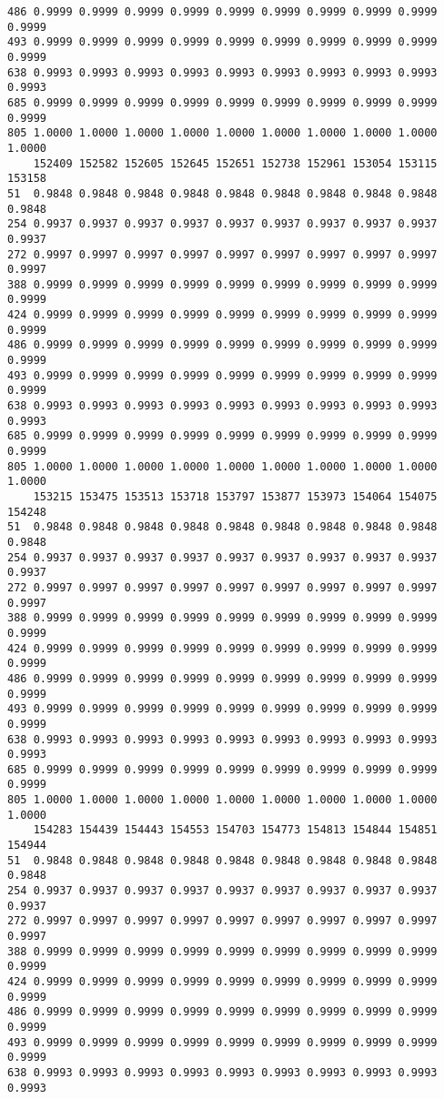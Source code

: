 \documentclass[
]{report}
\begin{document}
\begin{verbatim}
486 0.9999 0.9999 0.9999 0.9999 0.9999 0.9999 0.9999 0.9999 0.9999 0.9999
493 0.9999 0.9999 0.9999 0.9999 0.9999 0.9999 0.9999 0.9999 0.9999 0.9999
638 0.9993 0.9993 0.9993 0.9993 0.9993 0.9993 0.9993 0.9993 0.9993 0.9993
685 0.9999 0.9999 0.9999 0.9999 0.9999 0.9999 0.9999 0.9999 0.9999 0.9999
805 1.0000 1.0000 1.0000 1.0000 1.0000 1.0000 1.0000 1.0000 1.0000 1.0000
    152409 152582 152605 152645 152651 152738 152961 153054 153115 153158
51  0.9848 0.9848 0.9848 0.9848 0.9848 0.9848 0.9848 0.9848 0.9848 0.9848
254 0.9937 0.9937 0.9937 0.9937 0.9937 0.9937 0.9937 0.9937 0.9937 0.9937
272 0.9997 0.9997 0.9997 0.9997 0.9997 0.9997 0.9997 0.9997 0.9997 0.9997
388 0.9999 0.9999 0.9999 0.9999 0.9999 0.9999 0.9999 0.9999 0.9999 0.9999
424 0.9999 0.9999 0.9999 0.9999 0.9999 0.9999 0.9999 0.9999 0.9999 0.9999
486 0.9999 0.9999 0.9999 0.9999 0.9999 0.9999 0.9999 0.9999 0.9999 0.9999
493 0.9999 0.9999 0.9999 0.9999 0.9999 0.9999 0.9999 0.9999 0.9999 0.9999
638 0.9993 0.9993 0.9993 0.9993 0.9993 0.9993 0.9993 0.9993 0.9993 0.9993
685 0.9999 0.9999 0.9999 0.9999 0.9999 0.9999 0.9999 0.9999 0.9999 0.9999
805 1.0000 1.0000 1.0000 1.0000 1.0000 1.0000 1.0000 1.0000 1.0000 1.0000
    153215 153475 153513 153718 153797 153877 153973 154064 154075 154248
51  0.9848 0.9848 0.9848 0.9848 0.9848 0.9848 0.9848 0.9848 0.9848 0.9848
254 0.9937 0.9937 0.9937 0.9937 0.9937 0.9937 0.9937 0.9937 0.9937 0.9937
272 0.9997 0.9997 0.9997 0.9997 0.9997 0.9997 0.9997 0.9997 0.9997 0.9997
388 0.9999 0.9999 0.9999 0.9999 0.9999 0.9999 0.9999 0.9999 0.9999 0.9999
424 0.9999 0.9999 0.9999 0.9999 0.9999 0.9999 0.9999 0.9999 0.9999 0.9999
486 0.9999 0.9999 0.9999 0.9999 0.9999 0.9999 0.9999 0.9999 0.9999 0.9999
493 0.9999 0.9999 0.9999 0.9999 0.9999 0.9999 0.9999 0.9999 0.9999 0.9999
638 0.9993 0.9993 0.9993 0.9993 0.9993 0.9993 0.9993 0.9993 0.9993 0.9993
685 0.9999 0.9999 0.9999 0.9999 0.9999 0.9999 0.9999 0.9999 0.9999 0.9999
805 1.0000 1.0000 1.0000 1.0000 1.0000 1.0000 1.0000 1.0000 1.0000 1.0000
    154283 154439 154443 154553 154703 154773 154813 154844 154851 154944
51  0.9848 0.9848 0.9848 0.9848 0.9848 0.9848 0.9848 0.9848 0.9848 0.9848
254 0.9937 0.9937 0.9937 0.9937 0.9937 0.9937 0.9937 0.9937 0.9937 0.9937
272 0.9997 0.9997 0.9997 0.9997 0.9997 0.9997 0.9997 0.9997 0.9997 0.9997
388 0.9999 0.9999 0.9999 0.9999 0.9999 0.9999 0.9999 0.9999 0.9999 0.9999
424 0.9999 0.9999 0.9999 0.9999 0.9999 0.9999 0.9999 0.9999 0.9999 0.9999
486 0.9999 0.9999 0.9999 0.9999 0.9999 0.9999 0.9999 0.9999 0.9999 0.9999
493 0.9999 0.9999 0.9999 0.9999 0.9999 0.9999 0.9999 0.9999 0.9999 0.9999
638 0.9993 0.9993 0.9993 0.9993 0.9993 0.9993 0.9993 0.9993 0.9993 0.9993

\end{verbatim}
\end{document}
